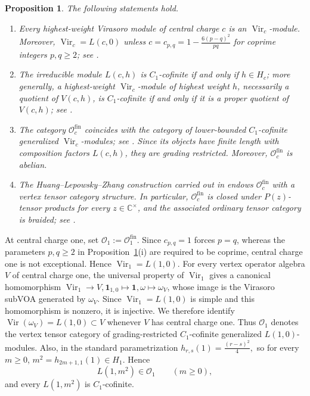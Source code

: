 \documentclass[10pt,a4paper]{amsart}
\numberwithin{equation}{section} \newtheorem{thm}{Theorem}[section] \newtheorem{lem}[thm]{Lemma} \newtheorem{ex}[thm]{Example} \newtheorem{prop}[thm]{Proposition} \newtheorem{cor}[thm]{Corollary} \newtheorem{defi}[thm]{Definition} \newtheorem{rmk}[thm]{Remark} \newtheorem{notation}[thm]{Notation}
\newcommand{\one}{\mathbf{1}}
\newcommand{\Vir}{\operatorname{Vir}}
\newcommand{\Ovir}{\mathcal O_1}
\begin{document}
\begin{prop}
\label{prop:CJORY-package}
The following statements hold.
\begin{enumerate}[label=\textnormal{(\roman*)}]
\item Every highest-weight Virasoro module of central charge $c$ is an
$\Vir_c$-module. Moreover, \(\Vir_c=L(c,0)\) unless \(c=c_{p,q}=1-\frac{6(p-q)^2}{pq}\) for coprime integers $p,q\ge2$; see \cite[Section~2.2 and Corollary~2.2.5(4)]{CJORY}.

\item The irreducible module $L(c,h)$ is $C_1$-cofinite if and only if
$h\in H_c$; more generally, a highest-weight $\Vir_c$-module of highest weight $h$, necessarily a quotient of $V(c,h)$, is $C_1$-cofinite if and only if it is a proper quotient of $V(c,h)$; see \cite[Corollary~2.2.7]{CJORY}.

\item The category $\mathcal O_c^{\mathrm{fin}}$ coincides with the category of lower-bounded $C_1$-cofinite generalized $\Vir_c$-modules; see \cite[Theorem~3.1.4]{CJORY}. Since its objects have finite length with composition factors $L(c,h)$, they are grading restricted. Moreover, $\mathcal O_c^{\mathrm{fin}}$ is abelian.

\item The Huang--Lepowsky--Zhang construction carried out in
\cite[Sections~4.1--4.2]{CJORY} endows $\mathcal O_c^{\mathrm{fin}}$ with a vertex tensor category structure. In particular, $\mathcal O_c^{\mathrm{fin}}$ is closed under $P(z)$-tensor products for every $z\in\mathbb C^\times$, and the associated ordinary tensor category is braided; see \cite[Corollary~4.1.8 and Theorem~4.2.6]{CJORY}.
\end{enumerate}
\end{prop}

At central charge one, set \(\mathcal O_1:=\mathcal O_1^{\mathrm{fin}}\). Since $c_{p,q}=1$ forces $p=q$, whereas the parameters $p,q\ge2$ in Proposition~\ref{prop:CJORY-package}(i) are required to be coprime, central charge one is not exceptional. Hence \(\Vir_1=L(1,0)\). For every vertex operator algebra $V$ of central charge one, the universal property of \(\Vir_1\) gives a canonical homomorphism \(\Vir_1\longrightarrow V,\one_{1,0}\longmapsto\one,\omega\longmapsto\omega_V\), whose image is the Virasoro subVOA generated by \(\omega_V\). Since \(\Vir_1=L(1,0)\) is simple and this homomorphism is nonzero, it is injective. We therefore identify \(\operatorname{Vir}(\omega_V)=L(1,0)\subset V\) whenever \(V\) has central charge one. Thus \(\Ovir\) denotes the vertex tensor category of grading-restricted $C_1$-cofinite generalized $L(1,0)$-modules. Also, in the standard parametrization \(h_{r,s}(1)=\frac{(r-s)^2}{4},\) so for every $m\ge0$, \(m^2=h_{2m+1,1}(1)\in H_1.\) Hence
\begin{equation}\label{eq:square-C1-cofinite}
L(1,m^2)\in\Ovir\qquad(m\ge0),
\end{equation}
and every $L(1,m^2)$ is $C_1$-cofinite.
\end{document}
